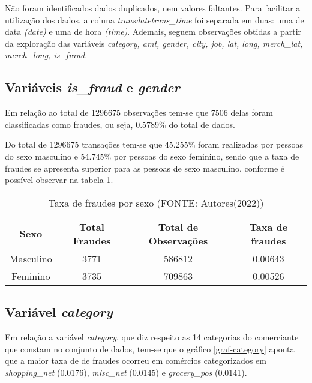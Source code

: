 \documentclass{article}
\begin{document}
Não foram identificados dados duplicados, nem valores faltantes. Para facilitar a utilização dos dados, a coluna \textit{transdatetrans\_time} foi separada em duas: uma de data \textit{(date)} e uma de hora \textit{(time)}. Ademais, seguem observações obtidas a partir da exploração das variáveis \textit{category, amt, gender, city, job, lat, long, merch\_lat, merch\_long, is\_fraud}.


\subsection{Variáveis \textit{is\_fraud} e \textit{gender}}

Em relação ao total de 1296675 observações tem-se que 7506 delas foram classificadas como fraudes, ou seja, 0.5789\% do total de dados.

Do total de 1296675 transações tem-se que 45.255\% foram realizadas por pessoas do sexo masculino e 54.745\% por pessoas do sexo feminino, sendo que a taxa de fraudes se apresenta superior para as pessoas de sexo masculino, conforme é possível observar na tabela \ref{tab-gender}. 

\begin{table}[!ht]
\centering
\begin{tabular}{cccc}
Sexo      & Total Fraudes & Total de Observações & Taxa de fraudes \\ \hline
Masculino & 3771          & 586812               & 0.00643         \\
Feminino  & 3735          & 709863               & 0.00526        
\end{tabular}
\caption{Taxa de fraudes por sexo (FONTE: Autores(2022))}
\label{tab-gender}
\end{table}

\subsection{Variável \textit{category}}

Em relação a variável \textit{category}, que diz respeito as 14 categorias do comerciante que constam no conjunto de dados, tem-se que o gráfico \ref{graf-category} aponta que a maior taxa de de fraudes ocorreu em comércios categorizados em \textit{shopping\_net} (0.0176), \textit{misc\_net} (0.0145) e \textit{grocery\_pos} (0.0141).
\end{document}

